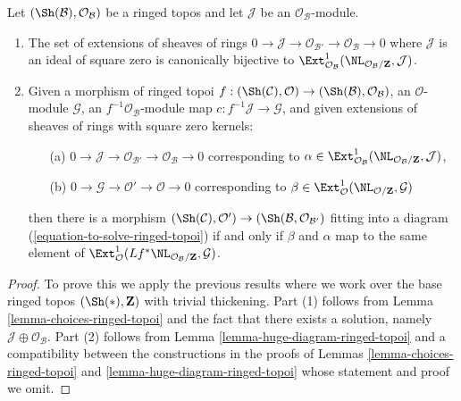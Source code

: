 \begin{lemma}
\label{lemma-extensions-of-ringed-topoi}
Let $(\Sh(\mathcal{B}), \mathcal{O}_\mathcal{B})$ be a ringed topos
and let $\mathcal{J}$ be an $\mathcal{O}_\mathcal{B}$-module.
\begin{enumerate}
\item The set of extensions of sheaves of rings
$0 \to \mathcal{J} \to \mathcal{O}_{\mathcal{B}'} \to
\mathcal{O}_\mathcal{B} \to 0$
where $\mathcal{J}$ is an ideal of square zero is canonically bijective to
$\Ext^1_{\mathcal{O}_\mathcal{B}}(
\NL_{\mathcal{O}_\mathcal{B}/\mathbf{Z}}, \mathcal{J})$.
\item Given a morphism of ringed topoi
$f : (\Sh(\mathcal{C}), \mathcal{O}) \to
(\Sh(\mathcal{B}), \mathcal{O}_\mathcal{B})$, an $\mathcal{O}$-module
$\mathcal{G}$, an $f^{-1}\mathcal{O}_\mathcal{B}$-module map
$c : f^{-1}\mathcal{J} \to \mathcal{G}$, and
given extensions of sheaves of rings with square zero kernels:
\begin{enumerate}
\item[(a)] $0 \to \mathcal{J} \to \mathcal{O}_{\mathcal{B}'} \to
\mathcal{O}_\mathcal{B} \to 0$ corresponding to
$\alpha \in \Ext^1_{\mathcal{O}_\mathcal{B}}(
\NL_{\mathcal{O}_\mathcal{B}/\mathbf{Z}}, \mathcal{J})$,
\item[(b)] $0 \to \mathcal{G} \to \mathcal{O}' \to \mathcal{O} \to 0$
corresponding to
$\beta \in \Ext^1_\mathcal{O}(\NL_{\mathcal{O}/\mathbf{Z}}, \mathcal{G})$
\end{enumerate}
then there is a morphism $(\Sh(\mathcal{C}), \mathcal{O}') \to
(\Sh(\mathcal{B}, \mathcal{O}_{\mathcal{B}'})$ fitting into a diagram
(\ref{equation-to-solve-ringed-topoi}) if and only if $\beta$ and $\alpha$
map to the same element of
$\Ext^1_\mathcal{O}(
Lf^*\NL_{\mathcal{O}_\mathcal{B}/\mathbf{Z}}, \mathcal{G})$.
\end{enumerate}
\end{lemma}

\begin{proof}
To prove this we apply the previous results where we work over
the base ringed topos $(\Sh(*), \mathbf{Z})$ with trivial thickening.
Part (1) follows from Lemma \ref{lemma-choices-ringed-topoi}
and the fact that there exists a solution, namely
$\mathcal{J} \oplus \mathcal{O}_\mathcal{B}$.
Part (2) follows from Lemma \ref{lemma-huge-diagram-ringed-topoi}
and a compatibility between the constructions in the proofs
of Lemmas \ref{lemma-choices-ringed-topoi} and
\ref{lemma-huge-diagram-ringed-topoi}
whose statement and proof we omit.
\end{proof}








